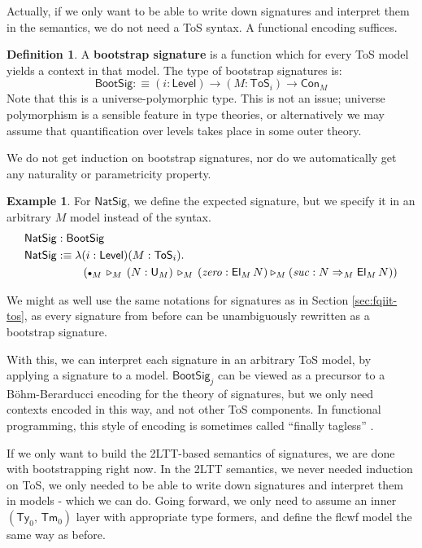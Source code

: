 \documentclass[12pt,a4paper,twoside,openany]{book}
\theoremstyle{remark}
\theoremstyle{definition}
\newtheorem{mydefinition}{Definition}
\newtheorem{myexample}{Example}
\theoremstyle{theorem}
\newcommand{\mi}[1]{\mathit{#1}}
\newcommand{\ms}[1]{\mathsf{#1}}
\newcommand{\Con}{\mathsf{Con}}
\newcommand{\Tm}{\mathsf{Tm}}
\newcommand{\Ty}{\mathsf{Ty}}
\newcommand{\U}{\mathsf{U}}
\newcommand{\El}{\mathsf{El}}
\newcommand{\ToS}{\mathsf{ToS}}
\newcommand{\ext}{\triangleright}
\newcommand{\emptycon}{\scaleobj{.75}\bullet}
\newcommand{\NatSig}{\mathsf{NatSig}}
\newcommand{\arri}{\Rightarrow}
\newcommand{\defn}{:\equiv}
\begin{document}
Actually, if we only want to be able to write down signatures and interpret them
in the semantics, we do not need a ToS syntax. A functional encoding suffices.

\begin{mydefinition} A \textbf{bootstrap signature} is a function which for every ToS model
yields a context in that model. The type of bootstrap signatures is:
\[
  \ms{BootSig} \defn (i : \ms{Level}) \to (M : \ToS_i) \to \Con_{M}
\]
Note that this is a universe-polymorphic type. This is not an issue; universe
polymorphism is a sensible feature in type theories, or alternatively we may
assume that quantification over levels takes place in some outer theory.

We do not get induction on bootstrap signatures, nor do we automatically
get any naturality or parametricity property.

\end{mydefinition}

\begin{myexample}
For $\ms{NatSig}$, we define the expected signature, but we specify it in an arbitrary
$M$ model instead of the syntax.
\begin{alignat*}{3}
  & \NatSig : \ms{BootSig}\\
  & \NatSig \defn \lambda (i :\ms{Level})(M : \ToS_i).\\
  & \hspace{5.2em}(\emptycon_M\,\ext_M\, (N : \U_M) \,\ext_M\,(\mi{zero} : \El_M\,N)
      \ext_M (\mi{suc} : N\arri_M\El_M\,N))
\end{alignat*}
\end{myexample}
We might as well use the same notations for signatures as in Section
\ref{sec:fqiit-tos}, as every signature from before can be unambiguously
rewritten as a bootstrap signature.

With this, we can interpret each signature in an arbitrary ToS model, by
applying a signature to a model. $\ms{BootSig}_j$ can be viewed as a precursor
to a Böhm-Berarducci encoding \cite{boehm-berarducci} for the theory of
signatures, but we only need contexts encoded in this way, and not other ToS
components. In functional programming, this style of encoding is sometimes
called ``finally tagless'' \cite{carette2007finally}.


If we only want to build the 2LTT-based semantics of signatures, we are done
with bootstrapping right now. In the 2LTT semantics, we never needed induction
on ToS, we only needed to be able to write down signatures and interpret them in
models - which we can do. Going forward, we only need to assume an inner
$(\Ty_0,\,\Tm_0)$ layer with appropriate type formers, and define the flcwf model
the same way as before.
\end{document}
